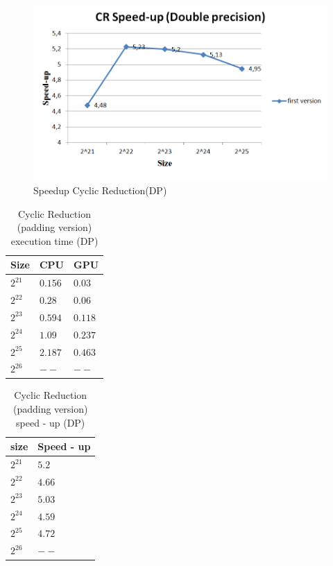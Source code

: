\begin{figure}[H]
   \centering
       \includegraphics[width=1\textwidth]{grafhmata/cr_first_dp_speedup.png}
   \caption{Speedup Cyclic Reduction(DP)}
   \label{fig:Speedup Cyclic Reduction(DP)}
\end{figure}

\begin{table}[H]
\caption{Cyclic Reduction (padding version) execution time (DP)} 
\centering 
\begin{tabular}{| l | p{3cm} | p{3cm} |} 
\hline\hline 
Size & CPU & GPU  \\ [0.8ex] 
\hline 
        $2^{21}$ & $0.156$& $0.03$ \\ 	
        $2^{22}$ & $0.28$& $0.06$  \\ 	
        $2^{23}$ & $0.594$& $0.118$ \\ 
        $2^{24}$ & $1.09$& $0.237$ \\ 
        $2^{25}$ & $2.187$& $0.463$  \\ 
        $2^{26}$ & $--$& $--$      \\ [1ex]
\hline 
\end{tabular}
\label{table:cr_padding_double} 
\end{table}

\begin{table}[H]
\caption{Cyclic Reduction (padding version) speed - up (DP)} 
\centering 
\begin{tabular}{| l | p{3cm} |} 
\hline\hline 
size	 & Speed - up  \\  [0.8ex] 
\hline        
        $2^{21}$ & $5.2$      \\	
        $2^{22}$ & $4.66$     \\
        $2^{23}$ & $5.03$      \\ 
        $2^{24}$ & $4.59$    \\ 
        $2^{25}$ & $4.72$     \\ 
        $2^{26}$ & $--$       \\ [1ex]
        \hline
\end{tabular}
\label{table:cr_padding_double_spup} 
\end{table}


